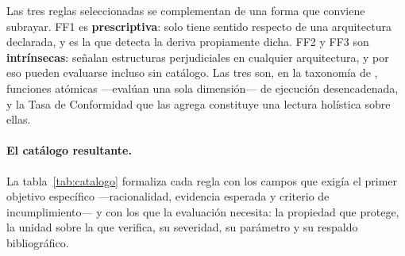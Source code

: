 Las tres reglas seleccionadas se complementan de una forma que conviene subrayar. FF1 es \textbf{prescriptiva}: solo tiene sentido respecto de una arquitectura declarada, y es la que detecta la deriva propiamente dicha. FF2 y FF3 son \textbf{intrínsecas}: señalan estructuras perjudiciales en cualquier arquitectura, y por eso pueden evaluarse incluso sin catálogo. Las tres son, en la taxonomía de \citet{FordParsonsKua2017}, funciones atómicas ---evalúan una sola dimensión--- de ejecución desencadenada, y la Tasa de Conformidad que las agrega constituye una lectura holística sobre ellas.

\paragraph{El catálogo resultante.}\label{sec:catalogo} La tabla~\ref{tab:catalogo} formaliza cada regla con los campos que exigía el primer objetivo específico ---racionalidad, evidencia esperada y criterio de incumplimiento--- y con los que la evaluación necesita: la propiedad que protege, la unidad sobre la que verifica, su severidad, su parámetro y su respaldo bibliográfico.

